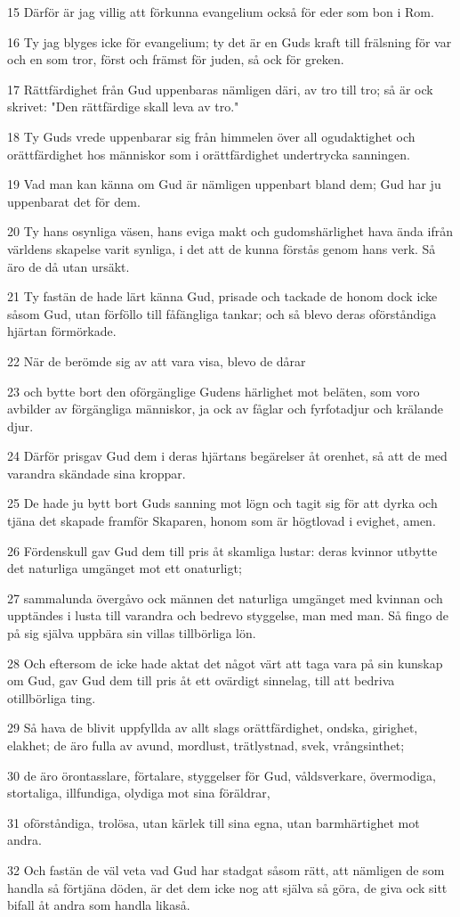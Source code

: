 \par 15 Därför är jag villig att förkunna evangelium också för eder som bon i Rom.
\par 16 Ty jag blyges icke för evangelium; ty det är en Guds kraft till frälsning för var och en som tror, först och främst för juden, så ock för greken.
\par 17 Rättfärdighet från Gud uppenbaras nämligen däri, av tro till tro; så är ock skrivet: "Den rättfärdige skall leva av tro."
\par 18 Ty Guds vrede uppenbarar sig från himmelen över all ogudaktighet och orättfärdighet hos människor som i orättfärdighet undertrycka sanningen.
\par 19 Vad man kan känna om Gud är nämligen uppenbart bland dem; Gud har ju uppenbarat det för dem.
\par 20 Ty hans osynliga väsen, hans eviga makt och gudomshärlighet hava ända ifrån världens skapelse varit synliga, i det att de kunna förstås genom hans verk. Så äro de då utan ursäkt.
\par 21 Ty fastän de hade lärt känna Gud, prisade och tackade de honom dock icke såsom Gud, utan förföllo till fåfängliga tankar; och så blevo deras oförståndiga hjärtan förmörkade.
\par 22 När de berömde sig av att vara visa, blevo de dårar
\par 23 och bytte bort den oförgänglige Gudens härlighet mot beläten, som voro avbilder av förgängliga människor, ja ock av fåglar och fyrfotadjur och krälande djur.
\par 24 Därför prisgav Gud dem i deras hjärtans begärelser åt orenhet, så att de med varandra skändade sina kroppar.
\par 25 De hade ju bytt bort Guds sanning mot lögn och tagit sig för att dyrka och tjäna det skapade framför Skaparen, honom som är högtlovad i evighet, amen.
\par 26 Fördenskull gav Gud dem till pris åt skamliga lustar: deras kvinnor utbytte det naturliga umgänget mot ett onaturligt;
\par 27 sammalunda övergåvo ock männen det naturliga umgänget med kvinnan och upptändes i lusta till varandra och bedrevo styggelse, man med man. Så fingo de på sig själva uppbära sin villas tillbörliga lön.
\par 28 Och eftersom de icke hade aktat det något värt att taga vara på sin kunskap om Gud, gav Gud dem till pris åt ett ovärdigt sinnelag, till att bedriva otillbörliga ting.
\par 29 Så hava de blivit uppfyllda av allt slags orättfärdighet, ondska, girighet, elakhet; de äro fulla av avund, mordlust, trätlystnad, svek, vrångsinthet;
\par 30 de äro örontasslare, förtalare, styggelser för Gud, våldsverkare, övermodiga, stortaliga, illfundiga, olydiga mot sina föräldrar,
\par 31 oförståndiga, trolösa, utan kärlek till sina egna, utan barmhärtighet mot andra.
\par 32 Och fastän de väl veta vad Gud har stadgat såsom rätt, att nämligen de som handla så förtjäna döden, är det dem icke nog att själva så göra, de giva ock sitt bifall åt andra som handla likaså.

